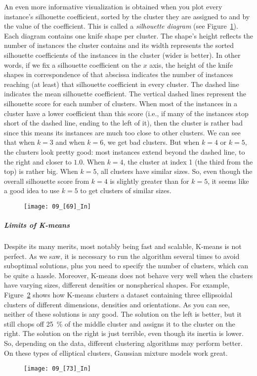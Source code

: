 An even more informative visualization is obtained when you plot every instance's silhouette coefficient, sorted by the cluster they are assigned to and by the value of the coefficient. This is called a \emph{silhouette diagram} (see Figure~\ref{09_[69]_In}). Each diagram contains one knife shape per cluster. The shape's height reflects the number of instances the cluster contains and its width represents the sorted silhouette coefficients of the instances in the cluster (wider is better). In other words, if we fix a silhouette coefficient on the $x$ axis, the height of the knife shapes in correspondence of that abscissa indicates the number of instances reaching (at least) that silhouette coefficient in every cluster. The dashed line indicates the mean silhouette coefficient. The vertical dashed lines represent the silhouette score for each number of clusters. When most of the instances in a cluster have a lower coefficient than this score (i.e., if many of the instances stop short of the dashed line, ending to the left of it), then the cluster is rather bad since this means its instances are much too close to other clusters. We can see that when $k=3$ and when $k=6$, we get bad clusters. But when $k=4$ or $k=5$, the clusters look pretty good: most instances extend beyond the dashed line, to the right and closer to $1.0$. When $k=4$, the cluster at index 1 (the third from the top) is rather big. When $k=5$, all clusters have similar sizes. So, even though the overall silhouette score from $k=4$ is slightly greater than for $k=5$, it seems like a good idea to use $k=5$ to get clusters of similar sizes.
\begin{figure}[h!t]
\centering
\texttt{[image: 09\_[69]\_In]}
\caption{}\label{09_[69]_In}
\end{figure}
\subparagraph{Limits of K-means}
Despite its many merits, most notably being fast and scalable, K-means is not perfect. As we saw, it is necessary to run the algorithm several times to avoid suboptimal solutions, plus you need to specify the number of clusters, which can be quite a hassle. Moreover, K-means does not behave very well when the clusters have varying sizes, different densities or nonspherical shapes. For example, Figure~\ref{09_[73]_In} shows how K-means clusters a dataset containing three ellipsoidal clusters of different dimensions, densities and orientations. As you can see, neither of these solutions is any good. The solution on the left is better, but it still chops off \SI{25}{\percent} of the middle cluster and assigns it to the cluster on the right. The solution on the right is just terrible, even though its inertia is lower. So, depending on the data, different clustering algorithms may perform better. On these types of elliptical clusters, Gaussian mixture models work great.
\begin{figure}[h!t]
\centering
\texttt{[image: 09\_[73]\_In]}
\caption{}\label{09_[73]_In}
\end{figure}

